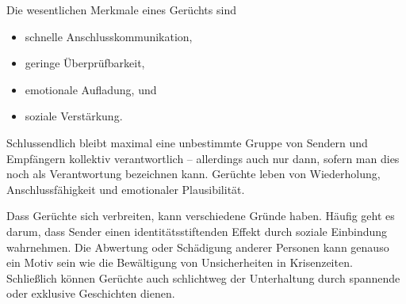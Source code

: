 Die wesentlichen Merkmale eines Gerüchts sind

\begin{itemize}
    \item schnelle Anschlusskommunikation,
    \item geringe Überprüfbarkeit, 
    \item emotionale Aufladung, und
    \item soziale Verstärkung.
\end{itemize}

Schlussendlich bleibt maximal eine unbestimmte Gruppe von Sendern und Empfängern kollektiv verantwortlich -- allerdings auch nur dann, sofern man dies noch als Verantwortung bezeichnen kann. Gerüchte leben von Wiederholung, Anschlussfähigkeit und emotionaler Plausibilität.

Dass Gerüchte sich verbreiten, kann verschiedene Gründe haben. Häufig geht es darum, dass Sender einen identitätsstiftenden Effekt durch soziale Einbindung wahrnehmen. Die Abwertung oder Schädigung anderer Personen kann genauso ein Motiv sein wie die Bewältigung von Unsicherheiten in Krisenzeiten. Schließlich können Gerüchte auch schlichtweg der Unterhaltung durch spannende oder exklusive Geschichten dienen.